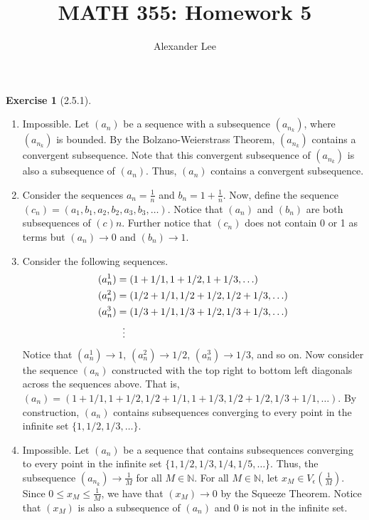 \documentclass{amsart}
\title{MATH 355: Homework 5}
\author{Alexander Lee}
\theoremstyle{definition}
\newtheorem{exercise}{Exercise}
\newcommand{\N}{\mathbb{N}}
\begin{document}
\maketitle

\begin{exercise}[2.5.1]
  \begin{enumerate}[label={(\alph*)}]
    \item Impossible. Let $(a_n)$ be a sequence with a subsequence $(a_{n_k})$,
      where $(a_{n_k})$ is bounded. By the Bolzano-Weierstrass Theorem,
      $(a_{n_k})$ contains a convergent subsequence. Note that this convergent
      subsequence of $(a_{n_k})$ is also a subsequence of $(a_n)$. Thus, $(a_n)$
      contains a convergent subsequence.
    \item Consider the sequences $a_n = \frac{1}{n}$ and $b_n = 1 +
      \frac{1}{n}$. Now, define the sequence $(c_n) = (a_1, b_1, a_2, b_2, a_3,
      b_3, \ldots)$. Notice that $(a_n)$ and $(b_n)$ are both subsequences of
      $(c)n$. Further notice that $(c_n)$ does not contain 0 or 1 as terms but
      $(a_n) \rightarrow 0$ and $(b_n) \rightarrow 1$.
    \item Consider the following sequences.
      \begin{align*}
        (a^1_n) &= (1 + 1/1, 1 + 1/2, 1 + 1/3, \ldots) \\
        (a^2_n) &= (1/2 + 1/1, 1/2 + 1/2, 1/2 + 1/3, \ldots) \\
        (a^3_n) &= (1/3 + 1/1, 1/3 + 1/2, 1/3 + 1/3, \ldots) \\
        &\vdotswithin{\dots}
      \end{align*}
      Notice that $(a^1_n) \rightarrow 1$, $(a^2_n) \rightarrow 1/2$, $(a^3_n)
      \rightarrow 1/3$, and so on. Now consider the sequence $(a_n)$ constructed
      with the top right to bottom left diagonals across the sequences above.
      That is, $(a_n) = (1 + 1/1, 1 + 1/2, 1/2 + 1/1, 1 + 1/3, 1/2 + 1/2, 1/3 +
      1/1, \ldots)$. By construction, $(a_n)$ contains subsequences converging
      to every point in the infinite set $\{1, 1/2, 1/3, \ldots\}$.
    \item Impossible. Let $(a_n)$ be a sequence that contains subsequences
      converging to every point in the infinite set $\{1, 1/2, 1/3, 1/4, 1/5,
      \ldots\}$. Thus, the subsequence $(a_{n_k}) \rightarrow \frac{1}{M}$ for
      all $M \in \N$. For all $M \in \N$, let $x_M \in V_\epsilon(\frac{1}{M})$.
      Since $0 \le x_M \le \frac{1}{M}$, we have that $(x_M) \rightarrow 0$ by
      the Squeeze Theorem. Notice that $(x_M)$ is also a subsequence of $(a_n)$
      and 0 is not in the infinite set.
  \end{enumerate}
\end{exercise}
\end{document}
